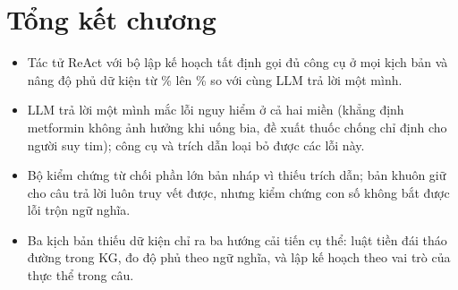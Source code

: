 \section{Tổng kết chương}
\begin{itemize}
  \item Tác tử ReAct với bộ lập kế hoạch tất định gọi đủ công cụ ở mọi kịch bản và nâng độ phủ dữ kiện từ
        \% lên \% so với cùng LLM trả lời một
        mình.
  \item LLM trả lời một mình mắc lỗi nguy hiểm ở cả hai miền (khẳng định metformin không ảnh hưởng khi uống bia, đề
        xuất thuốc chống chỉ định cho người suy tim); công cụ và trích dẫn loại bỏ được các lỗi này.
  \item Bộ kiểm chứng từ chối phần lớn bản nháp vì thiếu trích dẫn; bản khuôn giữ cho câu trả lời luôn truy vết được,
        nhưng kiểm chứng con số không bắt được lỗi trộn ngữ nghĩa.
  \item Ba kịch bản thiếu dữ kiện chỉ ra ba hướng cải tiến cụ thể: luật tiền đái tháo đường trong KG, đo độ phủ theo
        ngữ nghĩa, và lập kế hoạch theo vai trò của thực thể trong câu.
\end{itemize}
